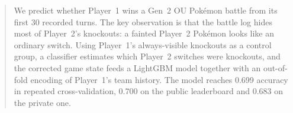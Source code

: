 \begin{abstract}
We predict whether Player~1 wins a Gen~2 OU Pok\'emon battle from its first 30 recorded turns.
The key observation is that the battle log hides most of Player~2's knockouts: a fainted
Player~2 Pok\'emon looks like an ordinary switch. Using Player~1's always-visible knockouts as a
control group, a classifier estimates which Player~2 switches were knockouts, and the corrected
game state feeds a LightGBM model together with an out-of-fold encoding of Player~1's team history.
The model reaches 0.699 accuracy in repeated cross-validation, 0.700 on the public leaderboard and
0.683 on the private one.
\end{abstract}
